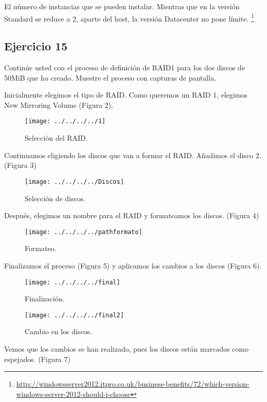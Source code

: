 \documentclass[a4paper, 11pt]{article} %
\begin{document}
El número de instancias que se pueden instalar. Mientras que en la versión Standard se reduce a 2, aparte del host, la versión Datacenter no pone límite. \footnote{\url{http://windowsserver2012.itpro.co.uk/business-benefits/72/which-version-windows-server-2012-should-i-choose}}


\subsection*{Ejercicio 15}
Continúe usted con el proceso de definición de RAID1 para los dos discos
de 50MiB que ha creado. Muestre el proceso con capturas de pantalla.

Inicialmente elegimos el tipo de RAID. Como queremos un RAID 1, elegimos New Mirroring Volume (Figura 2). 

\begin{figure}[htpb]
\texttt{[image: ../../../../1]}
\caption{Selección del RAID.}
\end{figure}

Continuamos eligiendo los discos que van a formar el RAID. Añadimos el disco 2. (Figura 3)

\begin{figure}[htpb]
\texttt{[image: ../../../../Discos]}
\caption{Selección de discos.}
\end{figure}

\pagebreak

Después, elegimos un nombre para el RAID y formateamos los discos. (Figura 4)

\begin{figure}[htpb]
\texttt{[image: ../../../../pathformato]}
\caption{Formateo.}
\end{figure}

\pagebreak

Finalizamos el proceso (Figura 5) y aplicamos los cambios a los discos (Figura 6).

\begin{figure}[htpb]
\texttt{[image: ../../../../final]}
\caption{Finalización.}
\end{figure}

\pagebreak

\begin{figure}[htpb]
\texttt{[image: ../../../../final2]}
\caption{Cambio en los discos.}
\end{figure}

\pagebreak

Vemos que los cambios se han realizado, pues los discos están marcados como espejados. (Figura 7)
\end{document}
